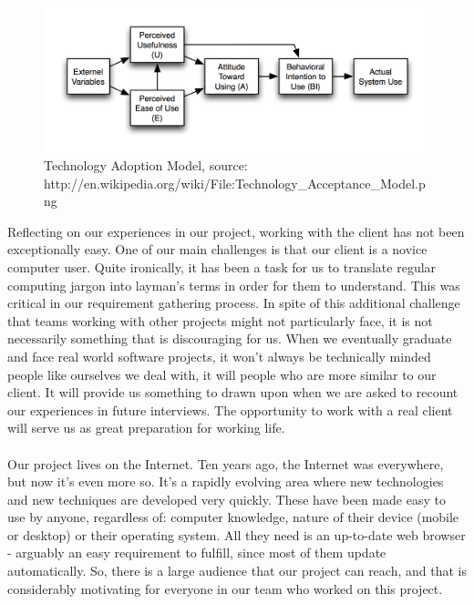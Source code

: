\documentclass{l3proj}
\begin{document}
\begin{figure}
\begin{center}
\includegraphics{tam}
\caption{Technology Adoption Model, source: \small{http://en.wikipedia.org/wiki/File:Technology\_Acceptance\_Model.png}}
\end{center}
\end{figure}

Reflecting on our experiences in our project, working with the client has not
been exceptionally easy. One of our main challenges is that our client is a
novice computer user. Quite ironically, it has been a task for us to translate
regular computing jargon into layman's terms in order for them to understand.
This was critical in our requirement gathering process. In spite of this
additional challenge that teams working with other projects might not
particularly face, it is not necessarily something that is discouraging for us.
When we eventually graduate and face real world software projects, it won't
always be technically minded people like ourselves we deal with, it will people
who are more similar to our client. It will provide us something to drawn upon
when we are asked to recount our experiences in future interviews. The
opportunity to work with a real client will serve us as great preparation for
working life.\\
\\
Our project lives on the Internet. Ten years ago, the Internet was everywhere,
but now it's even more so. It's a rapidly evolving area where new technologies
and new techniques are developed very quickly. These have been made easy to use
by anyone, regardless of: computer knowledge, nature of their device (mobile or
desktop) or their operating system. All they need is an up-to-date web browser -
arguably an easy requirement to fulfill, since most of them update
automatically. So, there is a large audience that our project can reach, and
that is considerably motivating for everyone in our team who worked on this
project.\\
\end{document}
